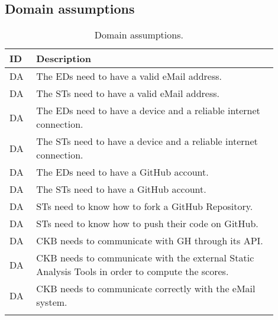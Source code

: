 \subsection{Domain assumptions}
\label{subsec:domain_assumptions}%
\setcounter{da}{1}
\newcommand{\cda}{\theda\stepcounter{da}}
\begin{center}
    \begin{longtable}{ |l|p{0.9\linewidth}| }
        \hline
        \textbf{ID} & \textbf{Description} \\
        \hline
        DA\cda      & The EDs need to have a valid eMail address. \\
        \hline
        DA\cda      & The STs need to have a valid eMail address. \\
        \hline
        DA\cda      & The EDs need to have a device and a reliable internet connection. \\
        \hline
        DA\cda      & The STs need to have a device and a reliable internet connection. \\
        \hline
        DA\cda      & The EDs need to have a GitHub account. \\
        \hline
        DA\cda      & The STs need to have a GitHub account. \\
        \hline
        DA\cda      & STs need to know how to fork a GitHub Repository. \\
        \hline
        DA\cda      & STs need to know how to push their code on GitHub. \\
        \hline
        DA\cda      & CKB needs to communicate with GH through its API. \\
        \hline
        DA\cda      & CKB needs to communicate with the external Static Analysis Tools in order to compute the scores. \\
        \hline
        DA\cda      & CKB needs to communicate correctly with the eMail system. \\
        \hline
        \caption{Domain assumptions.}
        \label{tab:domainassmptn_tab}%
    \end{longtable}
\end{center}